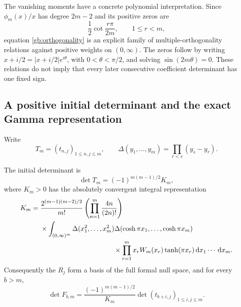 The vanishing moments have a concrete polynomial interpretation.
Since $\phi_m(x)/x$ has degree $2m-2$ and its positive zeros are
\[
                  \frac12\cot\frac{r\pi}{2m},\qquad1\le r<m,
\]
equation \eqref{gb:orthogonality} is an explicit family of
multiple-orthogonality relations against positive weights on
$(0,\infty)$.  The zeros follow by writing
$x+i/2=|x+i/2|e^{i\theta}$, with $0<\theta<\pi/2$, and solving
$\sin(2m\theta)=0$.  These relations do not imply that every
later consecutive coefficient determinant has one fixed sign.

\subsection{A positive initial determinant and the exact Gamma representation}

Write
\[
 T_m=(t_{n,j})_{1\le n,j\le m},\qquad
 \Delta(y_1,\ldots,y_m)=\prod_{r<s}(y_s-y_r).
\]

\begin{proposition}\label{gb:normalization}
The initial determinant is
\begin{equation}\label{gb:detT}
                 \det T_m=(-1)^{m(m-1)/2}K_m,
\end{equation}
where $K_m>0$ has the absolutely convergent integral representation
\begin{equation}\label{gb:Km}
\begin{split}
 K_m={}&\frac{2^{(m-1)(m-2)/2}}{m!}
             \left(\prod_{n=1}^m\frac{4n}{(2n)!}\right)\\
 &\times\int_{(0,\infty)^m}
       \Delta(x_1^2,\ldots,x_m^2)
       \Delta(\cosh\pi x_1,\ldots,\cosh\pi x_m)\\
 &\hspace{38mm}\times
       \prod_{r=1}^m x_rW_m(x_r)\tanh(\pi x_r)
                    \dd x_1\cdots\dd x_m.
\end{split}
\end{equation}
Consequently the $R_j$ form a basis of the full formal null space,
and for every $b>m$,
\begin{equation}\label{gb:exact-Gamma-determinant}
 \boxed{\displaystyle
 \det F_{b,m}=
  \frac{(-1)^{m(m-1)/2}}{K_m}
        \det(t_{b+i,j})_{1\le i,j\le m}.}
\end{equation}
\end{proposition}


